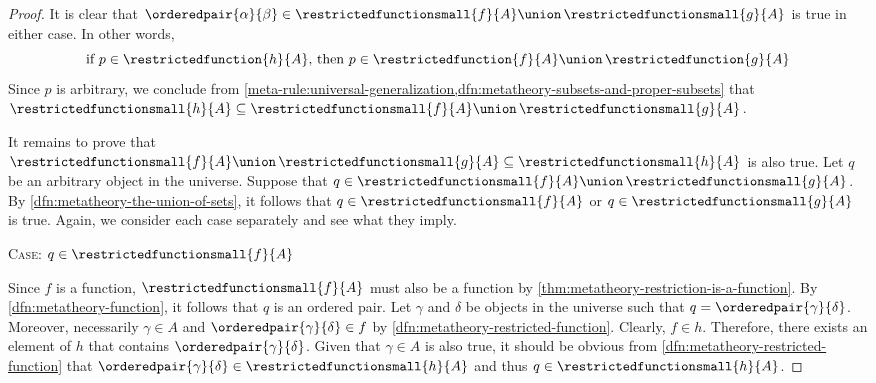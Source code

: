 \begin{proof}
    \vspace{0.3cm}
    \noindent
    It is clear that \( \orderedpair{\alpha}{\beta} \in \restrictedfunctionsmall{f}{A} \union \, \restrictedfunctionsmall{g}{A} \) is true in either case.
    In other words,
    \begin{equation*}
        \text{if \( p \in \restrictedfunction{h}{A} \), then \( p \in \restrictedfunction{f}{A} \union \, \restrictedfunction{g}{A} \)}
    \end{equation*}
    Since \( p \) is arbitrary, we conclude from \cref{meta-rule:universal-generalization,dfn:metatheory-subsets-and-proper-subsets} that
    \( \restrictedfunctionsmall{h}{A} \subseteq \restrictedfunctionsmall{f}{A} \union \, \restrictedfunctionsmall{g}{A} \).

    \vspace{0.3cm}
    \noindent
    It remains to prove that \( \restrictedfunctionsmall{f}{A} \union \, \restrictedfunctionsmall{g}{A} \subseteq \restrictedfunctionsmall{h}{A} \) is also true.
    Let \( q \) be an arbitrary object in the universe.
    Suppose that \( q \in \restrictedfunctionsmall{f}{A} \union \, \restrictedfunctionsmall{g}{A} \).
    By \cref{dfn:metatheory-the-union-of-sets}, it follows that \( q \in \restrictedfunctionsmall{f}{A} \) or \( q \in \restrictedfunctionsmall{g}{A} \)
    is true.
    Again, we consider each case separately and see what they imply.

    \vspace{0.3cm}
    \noindent
    {\scshape Case:} \( q \in \restrictedfunctionsmall{f}{A} \)

    \vspace{0.1cm}
    \noindent
    Since \( f \) is a function, \( \restrictedfunctionsmall{f}{A} \) must also be a function by \cref{thm:metatheory-restriction-is-a-function}.
    By \cref{dfn:metatheory-function}, it follows that \( q \) is an ordered pair.
    Let \( \gamma \) and \( \delta \) be objects in the universe such that \( q = \orderedpair{\gamma}{\delta} \).
    Moreover, necessarily \( \gamma \in A \) and \( \orderedpair{\gamma}{\delta} \in f \) by \cref{dfn:metatheory-restricted-function}.
    Clearly, \( f \in h \).
    Therefore, there exists an element of \( h \) that contains \( \orderedpair{\gamma}{\delta} \).
    Given that \( \gamma \in A \) is also true, it should be obvious from \cref{dfn:metatheory-restricted-function} that
    \( \orderedpair{\gamma}{\delta} \in \restrictedfunctionsmall{h}{A} \) and thus \( q \in \restrictedfunctionsmall{h}{A} \).


\end{proof}
